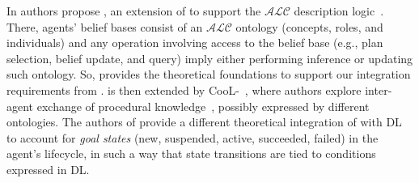 In \cite{DBLP:conf/dalt/MoreiraVBH05} authors propose \agentspeakdl{},
an extension of \agentspeak{} to support the $\mathcal{ALC}$ description logic~\cite{BAADER2008135}.
%
There,
agents' belief bases consist of an $\mathcal{ALC}$ ontology
(concepts, roles, and individuals)
and any operation involving access to the belief base
(e.g., plan selection, belief update, and query)
imply either performing inference or updating such ontology.
%
So,
\agentspeakdl{} provides the theoretical foundations to support our integration requirements from .
%
\agentspeakdl{} is then extended by CooL-\agentspeak{}~\cite{DBLP:journals/wias/MascardiABBR14},
where authors explore inter-agent exchange of procedural knowledge~\cite{DBLP:conf/dalt/AnconaM03},
possibly expressed by different ontologies.
%
%
The authors of \cite{DBLP:conf/iat/HalacED11} provide a different theoretical integration of \agentspeak{} with \ac{DL}
to account for \emph{goal states}
(new, suspended, active, succeeded, failed)
in the agent's lifecycle,
in such a way that state transitions are tied to conditions expressed in \ac{DL}.
%


